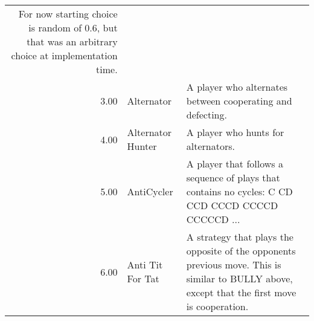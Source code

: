 \begin{tabular}{rll}
	For now starting choice is random of 0.6, but that was an arbitrary choice
	at implementation time.                                                                                                                                                                                                                                                                                                                                                                                                                                                                                                                                                                                                                                                                               \\
	3.00   & Alternator                  & A player who alternates between cooperating and defecting.                                                                        \\
	4.00   & Alternator Hunter           & A player who hunts for alternators.                                                                                               \\
	5.00   & AntiCycler                  & A player that follows a sequence of plays that contains no cycles:
	C CD CCD CCCD CCCCD CCCCCD ...                                                                                                                                                                                                                                                                                                                                                                                                                                                                                                                                                                                                                                                                                                                                                                                                                                                                                                                    \\
	6.00   & Anti Tit For Tat            & A strategy that plays the opposite of the opponents previous move.
	This is similar to BULLY above, except that the first move is cooperation.                                                                                                                                                                                                                                                                                                                                                                                                                                                                                                                                                                                                                                                                                                                                                                                                                                                                        \\

\end{tabular}
